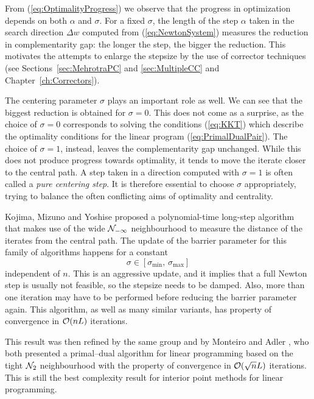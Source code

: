 From (\ref{eq:OptimalityProgress}) we observe that the progress in
optimization depends on both $\alpha$ and $\sigma$.
For a fixed $\sigma$, the length of the step $\alpha$ taken in 
the search direction
$\Delta w$ computed from (\ref{eq:NewtonSystem})
measures the reduction in complementarity gap: 
the longer the step, the bigger the reduction. This motivates
the attempts to enlarge the stepsize by the use of corrector
techniques (see Sections~\ref{sec:MehrotraPC} and
\ref{sec:MultipleCC} and Chapter~\ref{ch:Correctors}).

The centering parameter $\sigma$ plays an important role as well.
We can see that the biggest reduction is obtained for $\sigma = 0$.
This does not come as a surprise, as the choice of $\sigma = 0$
corresponds to solving the \KKT conditions (\ref{eq:KKT}) which
describe the optimality conditions for the linear program
(\ref{eq:PrimalDualPair}). The choice of $\sigma = 1$, instead,
leaves the complementarity gap unchanged. While this does not
produce progress towards optimality, it tends to move the iterate
closer to the central path. A step taken in a direction computed
with $\sigma = 1$ is often called a {\em pure centering step}.
It is therefore essential to choose $\sigma$ appropriately, trying
to balance the often conflicting aims of optimality and centrality.

Kojima, Mizuno and Yoshise \cite{KojimaMizunoYoshise89} 
proposed a polynomial-time long-step algorithm 
that makes use of the wide $\mathcal{N}_{-\infty}$ neighbourhood
to measure the distance of the iterates from the central path.
The update of the barrier parameter for this family of algorithms
happens for a constant 
\[
  \sigma \in [\sigma_{\min},\, \sigma_{\max}]
\]
independent of $n$. 
This is an aggressive update, and it implies that a full Newton
step is usually not feasible, so the stepsize needs to be damped.
Also, more than one iteration may have to be performed before
reducing the barrier parameter again.
This algorithm, as well as many similar variants, has
property of convergence in $\mathcal{O}(nL)$ iterations.

This result was then refined by the same group \cite{KojimaMizunoYoshise89b} 
and by Monteiro and Adler \cite{MonteiroAdler89a},
who both presented a primal--dual algorithm for linear programming 
based on the tight $\mathcal{N}_2$ neighbourhood
with the property of convergence in $\mathcal{O}(\sqrt{n}L)$ iterations.
This is still the best complexity result for interior point methods
for linear programming.

